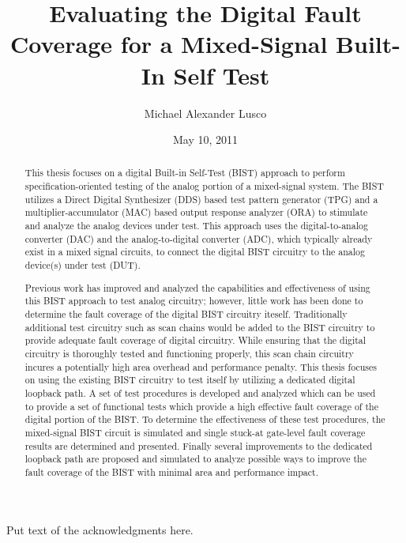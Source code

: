 \documentclass[12pt]{report}
\title{Evaluating the Digital Fault Coverage for a Mixed-Signal Built-In Self Test}
\author{Michael Alexander Lusco}
\date{May 10, 2011} %
\begin{document}
\begin{romanpages}      %

\TitlePage 

\begin{abstract}
This thesis focuses on a digital Built-in Self-Test (BIST) approach to perform specification-oriented testing of the analog portion of a mixed-signal system.  The BIST utilizes a Direct Digital Synthesizer (DDS) based test pattern generator (TPG) and a multiplier-accumulator (MAC) based output response analyzer (ORA) to stimulate and analyze the analog devices under test.  This approach uses the digital-to-analog converter (DAC) and the analog-to-digital converter (ADC), which typically already exist in a mixed signal circuits, to connect the digital BIST circuitry to the analog device(s) under test (DUT).

Previous work has improved and analyzed the capabilities and effectiveness of using this BIST approach to test analog circuitry; however, little work has been done to determine the fault coverage of the digital BIST circuitry iteself.  Traditionally additional test circuitry such as scan chains would be added to the BIST circuitry to provide adequate fault coverage of digital circuitry.  While ensuring that the digital circuitry is thoroughly tested and functioning properly, this scan chain circuitry incures a potentially high area overhead and performance penalty.  This thesis focuses on using the existing BIST circuitry to test itself by utilizing a dedicated digital loopback path.  A set of test procedures is developed and analyzed which can be used to provide a set of functional tests which provide a high effective fault coverage of the digital portion of the BIST.  To determine the effectiveness of these test procedures, the mixed-signal BIST circuit is simulated and single stuck-at gate-level fault coverage results are determined and presented.  Finally several improvements to the dedicated loopback path are proposed and simulated to analyze possible ways to improve the fault coverage of the BIST with minimal area and performance impact.
\end{abstract}

\begin{acknowledgments}
Put text of the acknowledgments here.
\end{acknowledgments}

\tableofcontents
\listoffigures
\listoftables

\printnomenclature[0.5in] %
\end{romanpages}        %
\end{document}
